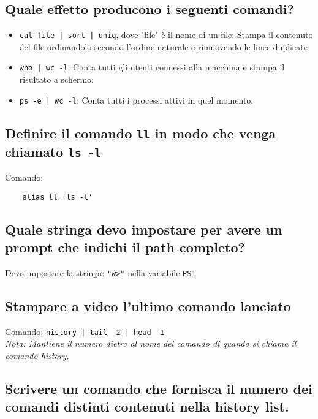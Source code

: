 \documentclass{article}
\begin{document}
\subsection{Quale effetto producono i seguenti comandi? }
\begin{itemize}
    \item \texttt{cat file | sort | uniq}, dove "file" è il nome di un file: Stampa il contenuto del file ordinandolo secondo l'ordine naturale
    e rimuovendo le linee duplicate
    \item \texttt{who | wc -l}: Conta tutti gli utenti connessi alla macchina e stampa il risultato a schermo.
    \item \texttt{ps -e | wc -l}: Conta tutti i processi attivi in quel momento.
\end{itemize}

\subsection{Definire il comando \texttt{ll} in modo che venga chiamato \texttt{ls -l}}
Comando:
\begin{verbatim}
    alias ll='ls -l'
\end{verbatim}

\subsection{Quale stringa devo impostare per avere un prompt che indichi il path completo?}
Devo impostare la stringa: \texttt{"w>"} nella variabile \texttt{PS1}

\subsection{Stampare a video l'ultimo comando lanciato}
Comando: \texttt{history | tail -2 | head -1}\\
\textit{Nota: Mantiene il numero dietro al nome del comando di quando si chiama il comando history.}

\subsection{Scrivere un comando che fornisca il numero dei comandi distinti contenuti nella history list.}
\end{document}
